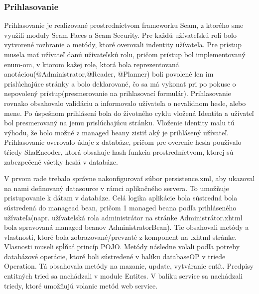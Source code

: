\subsubsection{Prihlasovanie}
Prihlasovanie je realizované prostredníctvom frameworku Seam, z ktorého sme využili moduly Seam Faces a Seam Security. Pre každú užívateľskú roli bolo vytvorené rozhranie a metódy, ktoré overovali indentity užívateľa. Pre prístup musela mať užívateľ danú užívateľskú rolu, pričom prístup bol implementovaný enum-om, v ktorom kažej role, ktorá bola reprezentovaná anotáciou(@Administrator,@Reader, @Planner) boli povolené len im prislúchajúce stránky a bolo deklarované, čo sa má vykonať pri po pokuse o nepovolený prístup(presmerovanie na prihlasovací formulár). Prihlasovanie rovnako obsahovalo validáciu a informovalo užívateľa o nevalidnom hesle, alebo mene. Po úspešnom prihlásení bola do životného cyklu vložená Identita a užívateľ bol presmerovaný na jemu prislúchajúcu stránku. Vloženie identity malu tú výhodu, že bolo možné z managed beany zistiť aký je prihlásený užívateľ. Prihlasovanie overovalo údaje z databáze, pričom pre overenie hesla používalo tŕiedy ShaEncoder, ktorá obsahuje hash funkcia prostredníctvom, ktorej sú zabezpečené všetky heslá v databáze.

V prvom rade trebalo správne nakonfigurovať súbor persistence.xml, aby ukazoval na nami definovaný datasource v rámci aplikačného servera. To umožňuje pristupovanie k dátam v databáze.
Celá logika aplikácie bola sústredná bola sústredená do managead bean, pričom 1 managed beana podľa prihláseného užívateľa(napr. užívatelská rola administrátor na stránke Administrátor.xhtml bola spravovaná managed beanov AdministratorBean). Tie obsahovali metódy a vlastnosti, ktoré bola zobrazované/prevzaté z komponent na .xhtml stránke. Vlasnosti museli spĺňať princíp POJO. Metódy následne volali podľa potreby databázové operácie, ktoré boli sústredené v balíku databaseOP v triede Operation. Tá obsahovala metódy na mazanie, update, vytváranie entít. Predpisy entitných tried sa nachádzali v module Entites. V balíku service sa nachádzali triedy, ktoré umožňujú volanie metód web service.


	










